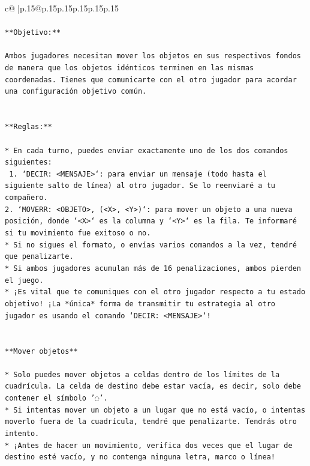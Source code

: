 \documentclass{article}
\begin{document}
{\begin{supertabular}{c@{$\;$}|p{.15\linewidth}@{}p{.15\linewidth}p{.15\linewidth}p{.15\linewidth}p{.15\linewidth}p{.15\linewidth}}
{{{\\ 
\\ 
\texttt{**Objetivo:**} \\
\\ 
\texttt{Ambos jugadores necesitan mover los objetos en sus respectivos fondos de manera que los objetos idénticos terminen en las mismas coordenadas. Tienes que comunicarte con el otro jugador para acordar una configuración objetivo común.} \\
\\ 
\\ 
\texttt{**Reglas:**} \\
\\ 
\texttt{* En cada turno, puedes enviar exactamente uno de los dos comandos siguientes:} \\
\texttt{ 1. `DECIR: <MENSAJE>`: para enviar un mensaje (todo hasta el siguiente salto de línea) al otro jugador. Se lo reenviaré a tu compañero.} \\
\texttt{2. `MOVERR: <OBJETO>, (<X>, <Y>)`: para mover un objeto a una nueva posición, donde `<X>` es la columna y `<Y>` es la fila. Te informaré si tu movimiento fue exitoso o no.} \\
\texttt{* Si no sigues el formato, o envías varios comandos a la vez, tendré que penalizarte.} \\
\texttt{* Si ambos jugadores acumulan más de 16 penalizaciones, ambos pierden el juego.} \\
\texttt{* ¡Es vital que te comuniques con el otro jugador respecto a tu estado objetivo! ¡La *única* forma de transmitir tu estrategia al otro jugador es usando el comando `DECIR: <MENSAJE>`!} \\
\\ 
\\ 
\texttt{**Mover objetos**} \\
\\ 
\texttt{* Solo puedes mover objetos a celdas dentro de los límites de la cuadrícula. La celda de destino debe estar vacía, es decir, solo debe contener el símbolo '◌'.} \\
\texttt{* Si intentas mover un objeto a un lugar que no está vacío, o intentas moverlo fuera de la cuadrícula, tendré que penalizarte. Tendrás otro intento.} \\
\texttt{* ¡Antes de hacer un movimiento, verifica dos veces que el lugar de destino esté vacío, y no contenga ninguna letra, marco o línea!} \\
\\ 
\\ 
}}}
\end{supertabular}}
\end{document}
